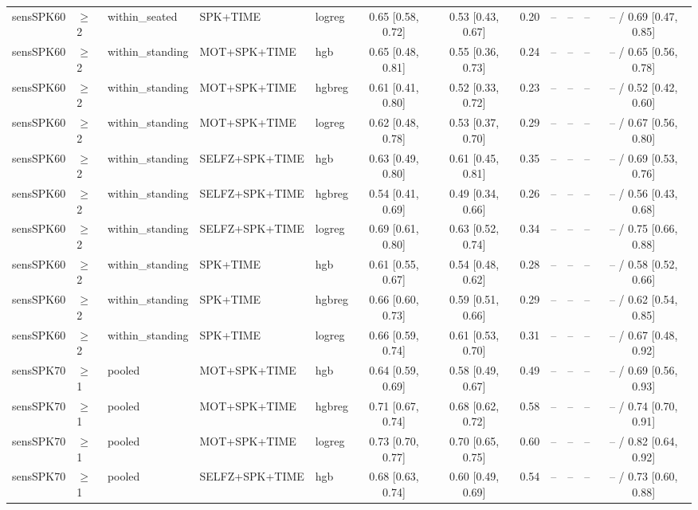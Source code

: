 \begin{longtable}{@{}lllllcccrrrc@{}}
sensSPK60 & $\geq$2 & within\_seated & SPK+TIME & logreg & 0.65 [0.58, 0.72] & 0.53 [0.43, 0.67] & 0.20 & -- & -- & -- & -- / 0.69 [0.47, 0.85] \\
sensSPK60 & $\geq$2 & within\_standing & MOT+SPK+TIME & hgb & 0.65 [0.48, 0.81] & 0.55 [0.36, 0.73] & 0.24 & -- & -- & -- & -- / 0.65 [0.56, 0.78] \\
sensSPK60 & $\geq$2 & within\_standing & MOT+SPK+TIME & hgbreg & 0.61 [0.41, 0.80] & 0.52 [0.33, 0.72] & 0.23 & -- & -- & -- & -- / 0.52 [0.42, 0.60] \\
sensSPK60 & $\geq$2 & within\_standing & MOT+SPK+TIME & logreg & 0.62 [0.48, 0.78] & 0.53 [0.37, 0.70] & 0.29 & -- & -- & -- & -- / 0.67 [0.56, 0.80] \\
sensSPK60 & $\geq$2 & within\_standing & SELFZ+SPK+TIME & hgb & 0.63 [0.49, 0.80] & 0.61 [0.45, 0.81] & 0.35 & -- & -- & -- & -- / 0.69 [0.53, 0.76] \\
sensSPK60 & $\geq$2 & within\_standing & SELFZ+SPK+TIME & hgbreg & 0.54 [0.41, 0.69] & 0.49 [0.34, 0.66] & 0.26 & -- & -- & -- & -- / 0.56 [0.43, 0.68] \\
sensSPK60 & $\geq$2 & within\_standing & SELFZ+SPK+TIME & logreg & 0.69 [0.61, 0.80] & 0.63 [0.52, 0.74] & 0.34 & -- & -- & -- & -- / 0.75 [0.66, 0.88] \\
sensSPK60 & $\geq$2 & within\_standing & SPK+TIME & hgb & 0.61 [0.55, 0.67] & 0.54 [0.48, 0.62] & 0.28 & -- & -- & -- & -- / 0.58 [0.52, 0.66] \\
sensSPK60 & $\geq$2 & within\_standing & SPK+TIME & hgbreg & 0.66 [0.60, 0.73] & 0.59 [0.51, 0.66] & 0.29 & -- & -- & -- & -- / 0.62 [0.54, 0.85] \\
sensSPK60 & $\geq$2 & within\_standing & SPK+TIME & logreg & 0.66 [0.59, 0.74] & 0.61 [0.53, 0.70] & 0.31 & -- & -- & -- & -- / 0.67 [0.48, 0.92] \\
sensSPK70 & $\geq$1 & pooled & MOT+SPK+TIME & hgb & 0.64 [0.59, 0.69] & 0.58 [0.49, 0.67] & 0.49 & -- & -- & -- & -- / 0.69 [0.56, 0.93] \\
sensSPK70 & $\geq$1 & pooled & MOT+SPK+TIME & hgbreg & 0.71 [0.67, 0.74] & 0.68 [0.62, 0.72] & 0.58 & -- & -- & -- & -- / 0.74 [0.70, 0.91] \\
sensSPK70 & $\geq$1 & pooled & MOT+SPK+TIME & logreg & 0.73 [0.70, 0.77] & 0.70 [0.65, 0.75] & 0.60 & -- & -- & -- & -- / 0.82 [0.64, 0.92] \\
sensSPK70 & $\geq$1 & pooled & SELFZ+SPK+TIME & hgb & 0.68 [0.63, 0.74] & 0.60 [0.49, 0.69] & 0.54 & -- & -- & -- & -- / 0.73 [0.60, 0.88] \\

\end{longtable}
